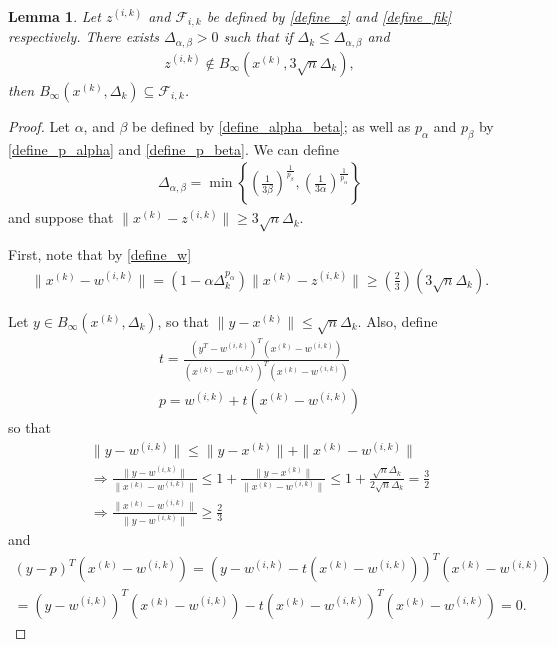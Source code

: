 \documentclass{article}
\newtheorem{lemma}[theorem]{Lemma}
\theoremstyle{case}
\numberwithin{theorem}{subsection}
\newcommand{\deltalargzik}{{\Delta_{\alpha,\beta}}}
\newcommand{\dk}{\Delta_k}
\newcommand{\fik}{{\mathcal F_{i, k}}}
\newcommand{\tr}{{ B_{\infty}\left(\xk, \dk\right) }}
\newcommand{\wik}{{w^{(i, k)}}}
\newcommand{\xk}{{x^{(k)}}}
\newcommand{\zik}{{z^{(i, k)}}}
\begin{document}
\begin{lemma}
\label{large_zik_means_means_no_intersection}
Let
$\zik$ and $\fik$
be defined by
\cref{define_z} and \cref{define_fik} respectively.
There exists $\deltalargzik > 0$ such that if $\dk \le \deltalargzik$ and 
\begin{align*}
\zik \not \in B_{\infty}(\xk, 3\sqrt{n}\dk),
\end{align*}
then $\tr \subseteq \fik$.
\end{lemma}
\begin{proof}
Let $\alpha$, and $\beta$ be defined by \cref{define_alpha_beta}; as well as $p_{\alpha}$ and $p_{\beta}$ by \cref{define_p_alpha} and \cref{define_p_beta}.
We can define
\begin{align}
\deltalargzik = \min\left\{
\left(\frac 1 {3\beta }\right)^{\frac 1 {p_{\beta }}},
\left(\frac 1 {3\alpha}\right)^{\frac 1 {p_{\alpha}}}
\right\} \label{define_deltalargzik}
\end{align}
and suppose that $\|\xk - \zik\| \ge 3 \sqrt{n} \dk$.

First, note that by \cref{define_w}
\begin{align*}
\|\xk - \wik\| = (1 - \alpha\dk^{p_{\alpha}}) \|\xk - \zik\| \ge \left(\frac 2 3\right) \left(3\sqrt{n}\dk\right).
\end{align*}

Let $y \in \tr$, so that $\|y - \xk\| \le \sqrt{n}\dk$.
Also, define
\begin{align*}
t  = \frac{(y^T - \wik)^T(\xk - \wik)}{\left(\xk - \wik\right)^T(\xk - \wik)} \\
p = \wik + t\left(\xk - \wik\right)
\end{align*}
so that
\begin{align*}
\|y - \wik\| \le \|y - \xk\| + \|\xk - \wik\| \\
\Longrightarrow \frac{\|y - \wik\|}{\|\xk - \wik\|} \le 1 +  \frac{\|y - \xk\|}{\|\xk - \wik\|} \le 1 + \frac{\sqrt{n}\dk}{2 \sqrt{n}\dk} = \frac 3 2\\
\Longrightarrow \frac{\|\xk - \wik\|}{\|y - \wik\|} \ge \frac 2 3
\end{align*}
and
\begin{align*}
\left(y - p\right)^T\left(\xk - \wik\right) = 
\left(y - \wik - t\left(\xk - \wik\right)\right)^T\left(\xk - \wik\right) \\
= \left(y - \wik\right)^T\left(\xk - \wik\right) - t\left(\xk - \wik\right)^T\left(\xk - \wik\right) = 0.
\end{align*}


\end{proof}
\end{document}
